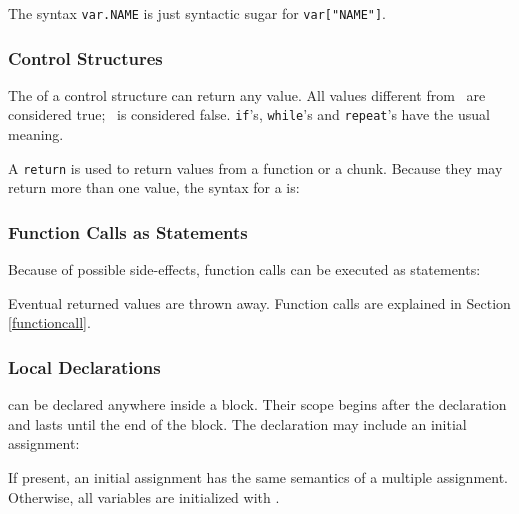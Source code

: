The syntax \verb'var.NAME' is just syntactic sugar for
\verb'var["NAME"]'.
\begin{Produc}
\end{Produc}%

\subsubsection{Control Structures}
The  of a control structure can return any value.
All values different from \nil\ are considered true;
\nil\ is considered false.
{\tt if}'s, {\tt while}'s and {\tt repeat}'s have the usual meaning.

\begin{Produc}
\end{Produc}

A {\tt return} is used to return values from a function or a chunk.
\label{return}
Because they may return more than one value,
the syntax for a  is:
\begin{Produc}
\end{Produc}

\subsubsection{Function Calls as Statements} \label{funcstat}
Because of possible side-effects,
function calls can be executed as statements:
\begin{Produc}
\end{Produc}%
Eventual returned values are thrown away.
Function calls are explained in Section \ref{functioncall}.

\subsubsection{Local Declarations} \label{localvar}
 can be declared anywhere inside a block.
Their scope begins after the declaration and lasts until the
end of the block.
The declaration may include an initial assignment:
\begin{Produc}
\end{Produc}%
If present, an initial assignment has the same semantics
of a multiple assignment.
Otherwise, all variables are initialized with \nil.


